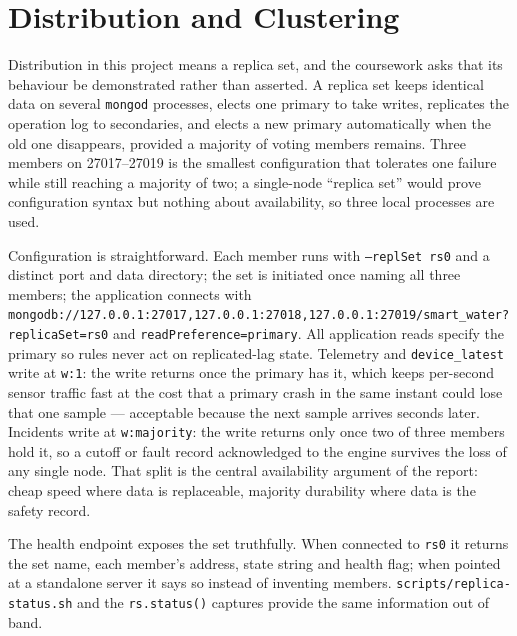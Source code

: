 \documentclass[11pt,a4paper]{article}
\begin{document}
\section{Distribution and Clustering}

Distribution in this project means a replica set, and the coursework asks that its behaviour be demonstrated rather than asserted. A replica set keeps identical data on several \texttt{mongod} processes, elects one primary to take writes, replicates the operation log to secondaries, and elects a new primary automatically when the old one disappears, provided a majority of voting members remains. Three members on 27017--27019 is the smallest configuration that tolerates one failure while still reaching a majority of two; a single-node ``replica set'' would prove configuration syntax but nothing about availability, so three local processes are used.

Configuration is straightforward. Each member runs with \texttt{--replSet rs0} and a distinct port and data directory; the set is initiated once naming all three members; the application connects with \texttt{mongodb://127.0.0.1:27017,127.0.0.1:27018,127.0.0.1:27019/smart\_water?replicaSet=rs0} and \texttt{readPreference=primary}. All application reads specify the primary so rules never act on replicated-lag state. Telemetry and \texttt{device\_latest} write at \texttt{w:1}: the write returns once the primary has it, which keeps per-second sensor traffic fast at the cost that a primary crash in the same instant could lose that one sample --- acceptable because the next sample arrives seconds later. Incidents write at \texttt{w:majority}: the write returns only once two of three members hold it, so a cutoff or fault record acknowledged to the engine survives the loss of any single node. That split is the central availability argument of the report: cheap speed where data is replaceable, majority durability where data is the safety record.

The health endpoint exposes the set truthfully. When connected to \texttt{rs0} it returns the set name, each member's address, state string and health flag; when pointed at a standalone server it says so instead of inventing members. \texttt{scripts/replica-status.sh} and the \texttt{rs.status()} captures provide the same information out of band.
\end{document}
